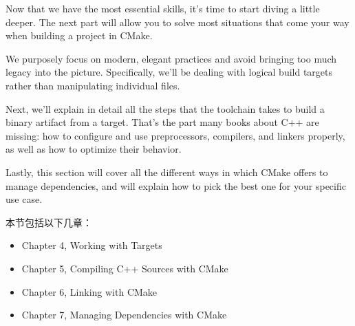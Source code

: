 Now that we have the most essential skills, it's time to start diving a little deeper. The next part will allow you to solve most situations that come your way when building a project in CMake.

We purposely focus on modern, elegant practices and avoid bringing too much legacy into the picture. Specifically, we'll be dealing with logical build targets rather than manipulating individual files.

Next, we'll explain in detail all the steps that the toolchain takes to build a binary artifact from a target. That's the part many books about C++ are missing: how to configure and use preprocessors, compilers, and linkers properly, as well as how to optimize their behavior.

Lastly, this section will cover all the different ways in which CMake offers to manage dependencies, and will explain how to pick the best one for your specific use case.

本节包括以下几章：

\begin{itemize}
\item Chapter 4, Working with Targets
\item Chapter 5, Compiling C++ Sources with CMake
\item Chapter 6, Linking with CMake
\item Chapter 7, Managing Dependencies with CMake
\end{itemize}
